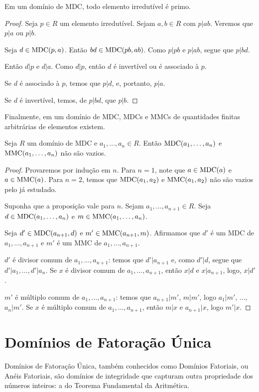 \begin{lemma}
    Em um domínio de MDC, todo elemento irredutível é primo.
    \end{lemma}
    
\begin{proof}
    Seja $p \in R$ um elemento irredutível.
    Sejam $a, b \in R$ com $p|ab$.
    Veremos que $p|a$ ou $p|b$.

    Seja $d\in\operatorname{MDC}(p, a)$.
    Então $bd\in \operatorname{MDC}(pb, ab)$.
    Como $p|pb$ e $p|ab$, segue que $p|bd$.

    Então $d|p$ e $d|a$.
    Como $d|p$, então $d$ é invertível ou é associado à $p$.

    Se $d$ é associado à $p$, temos que $p|d$, e, portanto, $p|a$.

    Se $d$ é invertível, temos, de $p|bd$, que $p|b$.
\end{proof}

Finalmente, em um domínio de MDC, MDCs e MMCs de quantidades finitas arbitrárias de elementos existem.

\begin{prop}
    Seja $R$ um domínio de MDC e $a_1, \dots, a_n \in R$.
    Então $\operatorname{MDC}(a_1, \dots, a_n)$ e $\operatorname{MMC}(a_1, \dots, a_n)$ não são vazios.
\end{prop}

\begin{proof}
Provaremos por indução em $n$.
Para $n=1$, note que $a\in \operatorname{MDC}(a)$ e $a \in \operatorname{MMC}(a)$.
Para $n=2$, temos que $\operatorname{MDC}(a_1, a_2)$ e $\operatorname{MMC}(a_1, a_2)$ não são vazios pelo já estudado.

Suponha que a proposição vale para $n$. Sejam $a_1, \dots, a_{n+1} \in R$.
Seja $d\in \operatorname{MDC}(a_1, \dots, a_n)$ e $m\in \operatorname{MMC}(a_1, \dots, a_n)$.

Seja $d' \in \operatorname{MDC}(a_{n+1}, d)$ e $m' \in \operatorname{MMC}(a_{n+1}, m)$.
Afirmamos que $d'$ é um MDC de $a_1, \dots, a_{n+1}$ e $m'$ é um MMC de $a_1, \dots, a_{n+1}$.

$d'$ é divisor comum de $a_1, \dots, a_{n+1}$: temos que $d'|a_{n+1}$ e, como $d'|d$, segue que $d'|a_1, \dots, d'|a_n$.
Se $x$ é divisor comum de $a_1, \dots, a_{n+1}$, então $x|d$ e $x|a_{n+1}$, logo, $x|d'$.

$m'$ é múltiplo comum de $a_1, \dots, a_{n+1}$: temos que $a_{n+1}|m'$, $m|m'$, logo $a_1|m'$, $\dots$, $a_n|m'$.
Se $x$ é múltiplo comum de $a_1, \dots, a_{n+1}$, então $m|x$ e $a_{n+1}|x$, logo $m'|x$.
\end{proof}
\section{Domínios de Fatoração Única}
Domínios de Fatoração Única, também conhecidos como Domínios Fatoriais, ou Anéis Fatoriais, são domínios de integridade que capturam outra propriedade dos números inteiros:
a do Teorema Fundamental da Aritmética.

